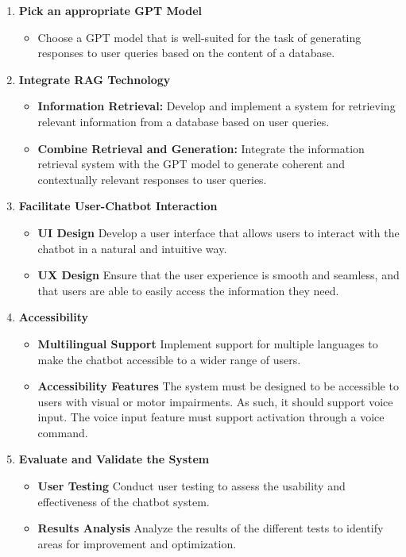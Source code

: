 \documentclass[a4paper,12pt,twoside]{ThesisStyle}
\begin{document}
\begin{enumerate}
  \item \textbf{Pick an appropriate GPT Model}
        \begin{itemize}
          \item Choose a GPT model that is well-suited for the task of generating responses to user queries based on the content of a database.
        \end{itemize}
  \item \textbf{Integrate RAG Technology}
        \begin{itemize}
          \item \textbf{Information Retrieval:} Develop and implement a system for retrieving relevant information from a database based on user queries.
          \item \textbf{Combine Retrieval and Generation:} Integrate the information retrieval system with the GPT model to generate coherent and contextually relevant responses to user queries.
        \end{itemize}
  \item \textbf{Facilitate User-Chatbot Interaction}
        \begin{itemize}
          \item \textbf{UI Design} Develop a user interface that allows users to interact with the chatbot in a natural and intuitive way.
          \item \textbf{UX Design} Ensure that the user experience is smooth and seamless, and that users are able to easily access the information they need.
        \end{itemize}
  \item \textbf{Accessibility}
        \begin{itemize}
          \item \textbf{Multilingual Support} Implement support for multiple languages to make the chatbot accessible to a wider range of users.
          \item \textbf{Accessibility Features} The system must be designed to be accessible to users with visual or motor impairments. As such, it should support voice input. The voice input feature must support activation through a voice command.
        \end{itemize}
  \item \textbf{Evaluate and Validate the System}
        \begin{itemize}
          \item \textbf{User Testing} Conduct user testing to assess the usability and effectiveness of the chatbot system.
          \item \textbf{Results Analysis} Analyze the results of the different tests to identify areas for improvement and optimization.
        \end{itemize}
\end{enumerate}
\end{document}
